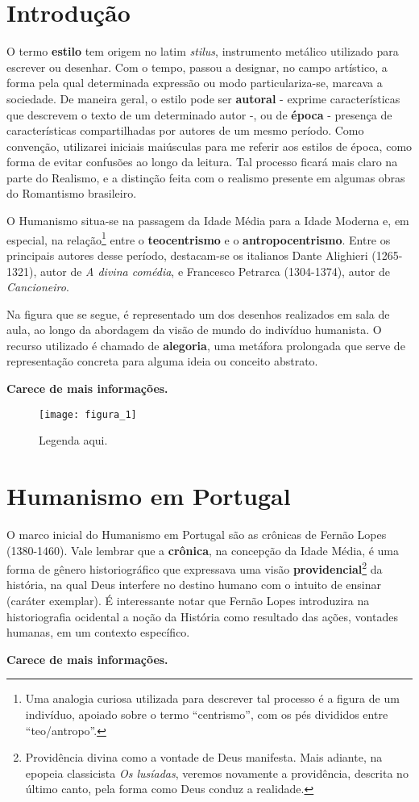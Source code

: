 \documentclass[12pt]{book}
\begin{document}
		\chapter{Introdução}
		\par O termo \textbf{estilo} tem origem no latim \textit{stilus}, instrumento metálico utilizado para escrever ou desenhar. Com o tempo, passou a designar, no campo artístico, a forma pela qual determinada expressão ou modo particulariza-se, marcava a sociedade. De maneira geral, o estilo pode ser \textbf{autoral} - exprime características que descrevem o texto de um determinado autor -, ou de \textbf{época} - presença de características compartilhadas por autores de um mesmo período. Como convenção, utilizarei iniciais maiúsculas para me referir aos estilos de época, como forma de evitar confusões ao longo da leitura. Tal processo ficará mais claro na parte do Realismo, e a distinção feita com o realismo presente em algumas obras do Romantismo brasileiro.
		\par O Humanismo situa-se na passagem da Idade Média para a Idade Moderna e, em especial, na relação\footnote{Uma analogia curiosa utilizada para descrever tal processo é a figura de um indivíduo, apoiado sobre o termo ``centrismo'', com os pés divididos entre ``teo/antropo''.} entre o \textbf{teocentrismo} e o \textbf{antropocentrismo}. Entre os principais autores desse período, destacam-se os italianos Dante Alighieri (1265-1321), autor de \textit{A divina comédia}, e Francesco Petrarca (1304-1374), autor de \textit{Cancioneiro}.
		\par Na figura que se segue, é representado um dos desenhos realizados em sala de aula, ao longo da abordagem da visão de mundo do indivíduo humanista. O recurso utilizado é chamado de \textbf{alegoria}, uma metáfora prolongada que serve de representação concreta para alguma ideia ou conceito abstrato.
		\par \textbf{Carece de mais informações.}
		\begin{figure}[h]
			\centering
			\texttt{[image: figura\_1]}
			\caption{Legenda aqui.}
			\label{fig:mesh1}
		\end{figure}
	
		\chapter{Humanismo em Portugal}
		\par O marco inicial do Humanismo em Portugal são as crônicas de Fernão Lopes (1380-1460). Vale lembrar que a \textbf{crônica}, na concepção da Idade Média, é uma forma de gênero historiográfico que expressava uma visão \textbf{providencial}\footnote{Providência divina como a vontade de Deus manifesta. Mais adiante, na epopeia classicista \textit{Os lusíadas}, veremos novamente a providência, descrita no último canto, pela forma como Deus conduz a realidade.} da história, na qual Deus interfere no destino humano com o intuito de ensinar (caráter exemplar). É interessante notar que Fernão Lopes introduzira na historiografia ocidental a noção da História como resultado das ações, vontades humanas, em um contexto específico.
		\par \textbf{Carece de mais informações.}
		
\end{document}
